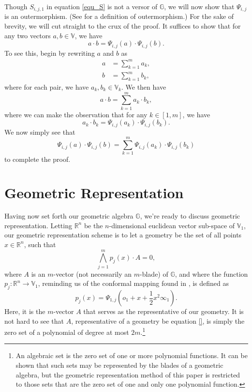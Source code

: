 \documentclass{ecgd-l}
\theoremstyle{definition}
\theoremstyle{remark}
\numberwithin{equation}{section}
\newcommand{\G}{\mathbb{G}}
\newcommand{\V}{\mathbb{V}}
\newcommand{\R}{\mathbb{R}}
\newcommand{\nvai}{\infty}
\newcommand{\nvao}{o}
\begin{document}
Though $S_{i,j,1}$ in equation \eqref{equ_S} is not a versor of $\G$, we will now show that $\Psi_{i,j}$ is an outermorphism.
(See \cite{} for a definition of outermorphism.)  For the sake of brevity, we will cut straight
to the crux of the proof.  It suffices to show that
for any two vectors $a,b\in\V$, we have
\begin{equation*}
a\cdot b = \Psi_{i,j}(a)\cdot \Psi_{i,j}(b).
\end{equation*}
To see this, begin by rewriting $a$ and $b$ as
\begin{align*}
a &= \sum_{k=1}^m a_k, \\
b &= \sum_{k=1}^m b_k,
\end{align*}
where for each pair, we have $a_k,b_k\in\V_k$.  We then have
\begin{equation*}
a\cdot b=\sum_{k=1}^m a_k\cdot b_k,
\end{equation*}
where we can make the observation that for any $k\in[1,m]$, we have
\begin{equation*}
a_k\cdot b_k = \Psi_{i,j}(a_k)\cdot\Psi_{i,j}(b_k).
\end{equation*}
We now simply see that
\begin{equation*}
\Psi_{i,j}(a)\cdot\Psi_{i,j}(b)=\sum_{k=1}^m\Psi_{i,j}(a_k)\cdot\Psi_{i,j}(b_k)
\end{equation*}
to complete the proof.

\section{Geometric Representation}

Having now set forth our geometric algebra $\G$, we're ready to discuss
geometric representation.
Letting $\R^n$ be the $n$-dimensional euclidean vector sub-space
of $\V_1$, our geometric representation scheme is to let a geometry be the
set of all points $x\in\R^n$, such that
\begin{equation*}
\bigwedge_{j=1}^m p_j(x)\cdot A=0,
\end{equation*}
where $A$ is an $m$-vector (not necessarily an $m$-blade) of $\G$, and
where the function $p_j:\R^n\to\V_1$, reminding us of the conformal mapping found in \cite{}, is defined as
\begin{equation*}
p_j(x)=\Psi_{1,j}\left(\nvao_1+x+\frac{1}{2}x^2\nvai_1\right).
\end{equation*}
Here, it is the $m$-vector $A$ that serves as the representative of our geometry.
It is not hard to see that $A$, representative of a geometry be equation \eqref{},
is simply the zero set of a polynomial of degree at most $2m$.\footnote{An algebraic
set is the zero set of one or more polynomial functions.  It can be shown that such sets may be represented by
the blades of a geometric algebra, but the geometric representation method of this paper is restricted to those sets
that are the zero set of one and only one polynomial function.}
\end{document}
